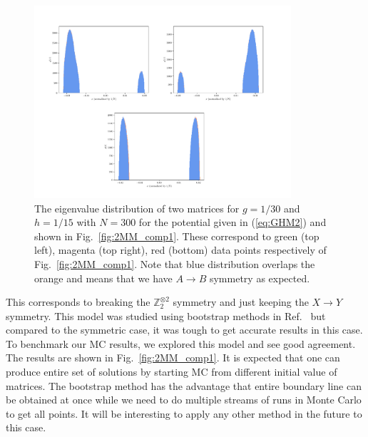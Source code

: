 \documentclass[letter,11pt]{article}
\begin{document}
\begin{figure}[htbp] 
	\centering 
	\includegraphics[width=0.85\textwidth]{figs/all_symb_ev.pdf}
	\caption{\label{fig:2MM_evd}The eigenvalue distribution of two matrices for $g=1/30$ and $h=1/15$ 
	with $N=300$ for the potential given in (\ref{eq:GHM2}) and shown in Fig.~\ref{fig:2MM_comp1}.
	These correspond to green (top left), magenta (top right), red (bottom) data points respectively of Fig.~\ref{fig:2MM_comp1}.
	Note that blue distribution overlaps the orange and means that we have $A \to B$ symmetry as expected.}
\end{figure}
This corresponds to breaking the $\mathbb{Z}_{2}^{\otimes 2}$ symmetry and just keeping the $X \to Y$ symmetry. This model was studied using bootstrap methods in 
Ref.~\cite{Kazakov:2021lel} but compared to the symmetric case, it was tough to get accurate results in this case. 
To benchmark our MC results, we explored this model
and see good agreement. The results are shown in Fig.~\ref{fig:2MM_comp1}. It is expected that one can produce entire set of solutions by starting MC from different initial value of matrices. The bootstrap method has the advantage that entire boundary line can be obtained at once while we need to do multiple streams of runs in Monte Carlo to get all points. It will be interesting to apply any other method in the future to this case.   
\end{document}
